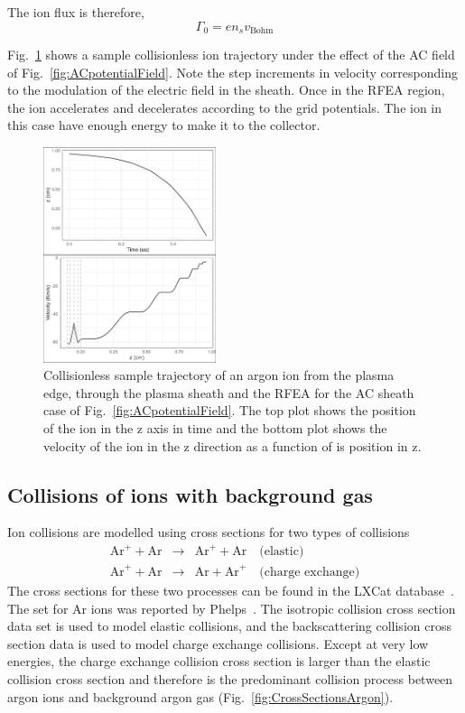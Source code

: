 The ion flux is therefore, 
\begin{equation}
\Gamma_0 = e n_s v_\text{Bohm} 
\end{equation}

Fig.~\ref{fig:CollisionlessACtrajectory} shows a sample collisionless ion trajectory under the effect of the AC field of Fig.~\ref{fig:ACpotentialField}. Note the step increments in velocity corresponding to the modulation of the electric field in the sheath. Once in the RFEA region, the ion accelerates and decelerates according to the grid potentials. The ion in this case have enough energy to make it to the collector. 

\begin{figure}[htbp]
\centering
\includegraphics[width=0.45\textwidth]{Figures/ionTrajectory0.5Pa13.56MHz2kVStack2332_Collisionless.jpeg}
\caption{Collisionless sample trajectory of an argon ion from the plasma edge, through the plasma sheath and the RFEA for the AC sheath case of Fig.~\ref{fig:ACpotentialField}. The top plot shows the position of the ion in the z axis in time and the bottom plot shows the velocity of the ion in the z direction as a function of is position in z. }
\label{fig:CollisionlessACtrajectory}
\end{figure}



\subsection{\label{IonCollision}Collisions of ions with background gas}
Ion collisions are modelled using cross sections for two types of collisions
\begin{eqnarray}
\text{Ar}^+ + \text{Ar} &\rightarrow& \text{Ar}^+ + \text{Ar} \quad \text{(elastic)} \\
\text{Ar}^+ + \text{Ar} &\rightarrow& \text{Ar} + \text{Ar}^+ \quad \text{(charge exchange)} 
\end{eqnarray}
The cross sections for these two processes can be found in the LXCat database~\cite{LXCat}. The set for Ar ions was reported by Phelps~\cite{Phelps1994}. The isotropic collision cross section data set is used to model elastic collisions, and the backscattering collision cross section data is used to model charge exchange collisions. Except at very low energies, the charge exchange collision cross section is larger than the elastic collision cross section and therefore is the predominant collision process between argon ions and background argon gas (Fig.~\ref{fig:CrossSectionsArgon}). 

